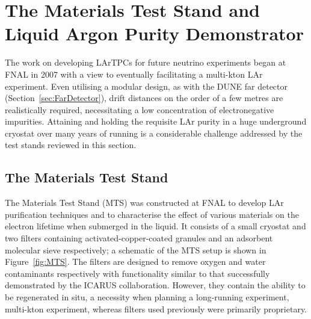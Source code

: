 \section[The Materials Test Stand and Liquid Argon Purity Demonstrator]{The Materials Test Stand and\\Liquid Argon Purity Demonstrator}\label{sec:MTSLAPD}

The work on developing LArTPCs for future neutrino experiments began at FNAL in 2007 with a view to eventually facilitating a multi-kton LAr experiment.  Even utilising a modular design, as with the DUNE far detector (Section~\ref{sec:FarDetector}), drift distances on the order of a few metres are realistically required, necessitating a low concentration of electronegative impurities.  Attaining and holding the requisite LAr purity in a huge underground cryostat over many years of running is a considerable challenge addressed by the test stands reviewed in this section.

\subsection{The Materials Test Stand}

The Materials Test Stand (MTS) \cite{MTS2006,MTS2009a,MTS2009b,MTS2011} was constructed at FNAL to develop LAr purification techniques and to characterise the effect of various materials on the electron lifetime when submerged in the liquid.  It consists of a small cryostat and two filters containing activated-copper-coated granules and an adsorbent molecular sieve respectively; a schematic of the MTS setup is shown in Figure~\ref{fig:MTS}.  The filters are designed to remove oxygen and water contaminants respectively with functionality similar to that successfully demonstrated by the ICARUS collaboration.  However, they contain the ability to be regenerated in situ, a necessity when planning a long-running experiment, multi-kton experiment, whereas filters used previously were primarily proprietary.

